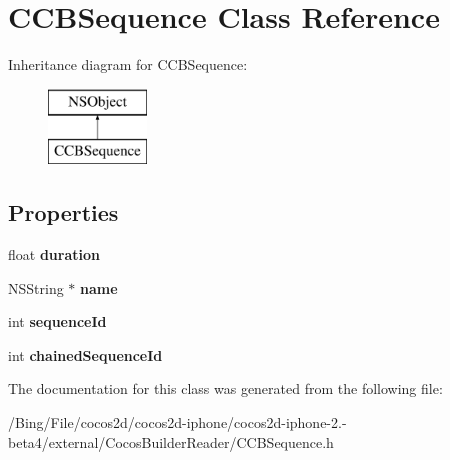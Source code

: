\hypertarget{interface_c_c_b_sequence}{\section{C\-C\-B\-Sequence Class Reference}
\label{interface_c_c_b_sequence}
}
Inheritance diagram for C\-C\-B\-Sequence\-:\begin{figure}[H]
\begin{center}
\leavevmode
\includegraphics[height=2.000000cm]{interface_c_c_b_sequence}
\end{center}
\end{figure}
\subsection*{Properties}
\begin{DoxyCompactItemize}
\item 
\hypertarget{interface_c_c_b_sequence_ab27913b9d7b3f15368e6568a2813e68d}{float {\bfseries duration}}\label{interface_c_c_b_sequence_ab27913b9d7b3f15368e6568a2813e68d}

\item 
\hypertarget{interface_c_c_b_sequence_a5c2f0b40a4176d019110c9ba8bd1192f}{N\-S\-String $\ast$ {\bfseries name}}\label{interface_c_c_b_sequence_a5c2f0b40a4176d019110c9ba8bd1192f}

\item 
\hypertarget{interface_c_c_b_sequence_a26c6971d33a96467b56bdb196511e990}{int {\bfseries sequence\-Id}}\label{interface_c_c_b_sequence_a26c6971d33a96467b56bdb196511e990}

\item 
\hypertarget{interface_c_c_b_sequence_ab42f3fb74d93fa840cb1343b8d79cf7e}{int {\bfseries chained\-Sequence\-Id}}\label{interface_c_c_b_sequence_ab42f3fb74d93fa840cb1343b8d79cf7e}

\end{DoxyCompactItemize}


The documentation for this class was generated from the following file\-:\begin{DoxyCompactItemize}
\item 
/\-Bing/\-File/cocos2d/cocos2d-\/iphone/cocos2d-\/iphone-\/2.-\/beta4/external/\-Cocos\-Builder\-Reader/C\-C\-B\-Sequence.\-h\end{DoxyCompactItemize}
